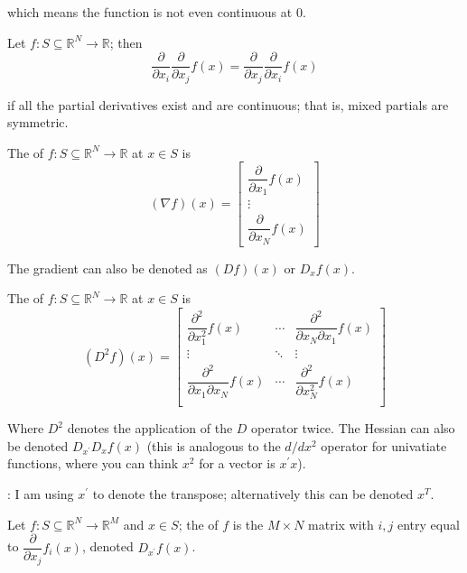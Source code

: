 \documentclass{article}
\begin{document}
which means the function is not even continuous at $0$.

\begin{theorem}
  Let $f: S \subseteq \mathbb{R}^N \to \mathbb{R}$; then
  \[
    \dfrac{\partial}{\partial x_i} \dfrac{\partial}{\partial x_j} f(x)
    =
    \dfrac{\partial}{\partial x_j} \dfrac{\partial}{\partial x_i} f(x)
  \]

  if all the partial derivatives exist and are continuous; that is, mixed partials are symmetric.
\end{theorem}

\begin{definition}
  The  of $f: S \subseteq \mathbb{R}^N \to \mathbb{R}$ at $x \in S$ is
  \[
    (\nabla f)(x) = \left[\begin{matrix}
      \dfrac{\partial}{\partial x_1} f(x) \\
      \vdots \\
      \dfrac{\partial}{\partial x_N} f(x)
    \end{matrix}\right]
  \]

  The gradient can also be denoted as $(Df)(x)$ or $D_x f(x)$.
\end{definition}

\begin{definition}
  The  of $f: S \subseteq \mathbb{R}^N \to \mathbb{R}$ at $x \in S$ is
  \[
    (D^2 f)(x) = \left[\begin{matrix}
      \dfrac{\partial^2}{\partial x_1^2} f(x) & \cdots & \dfrac{\partial^2}{\partial x_N \partial x_1} f(x) \\
      \vdots & \ddots & \vdots \\
      \dfrac{\partial^2}{\partial x_1 \partial x_N} f(x) & \cdots & \dfrac{\partial^2}{\partial x_N^2} f(x) \\
    \end{matrix}\right]
  \]

  Where $D^2$ denotes the application of the $D$ operator twice. The Hessian can also be denoted $D_{x^\prime} D_x f(x)$ (this is analogous to the $d/dx^2$ operator for univatiate functions, where you can think $x^2$ for a vector is $x^\prime x$).
\end{definition}

\NB: I am using $x^\prime$ to denote the transpose; alternatively this can be denoted $x^T$.
\begin{definition}
  Let $f: S \subseteq \mathbb{R}^N \to \mathbb{R}^M$ and $x \in S$; the  of $f$ is the $M \times N$ matrix with $i, j$ entry equal to $\dfrac{\partial}{\partial x_j} f_i(x)$, denoted $D_{x^\prime} f(x)$.
\end{definition}
\end{document}
